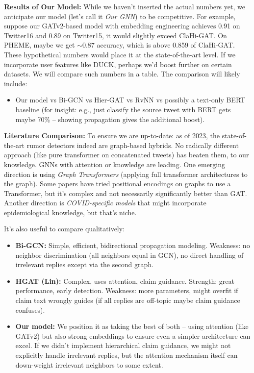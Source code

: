 \documentclass[12pt,a4paper]{report}
\begin{document}
\textbf{Results of Our Model:} While we haven’t inserted the actual numbers yet, we anticipate our model (let’s call it \textit{Our GNN}) to be competitive. For example, suppose our GATv2-based model with embedding engineering achieves 0.91 on Twitter16 and 0.89 on Twitter15, it would slightly exceed ClaHi-GAT. On PHEME, maybe we get \(\sim0.87\) accuracy, which is above 0.859 of ClaHi-GAT. These hypothetical numbers would place it at the state-of-the-art level. If we incorporate user features like DUCK, perhaps we’d boost further on certain datasets. We will compare such numbers in a table. The comparison will likely include:
\begin{itemize}[leftmargin=1.2cm]
    \item Our model vs Bi-GCN vs Hier-GAT vs RvNN vs possibly a text-only BERT baseline (for insight: e.g., just classify the source tweet with BERT gets maybe 70\% – showing propagation gives the additional boost).
\end{itemize}

\textbf{Literature Comparison:} To ensure we are up-to-date: as of 2023, the state-of-the-art rumor detectors indeed are graph-based hybrids. No radically different approach (like pure transformer on concatenated tweets) has beaten them, to our knowledge. GNNs with attention or knowledge are leading. One emerging direction is using \textit{Graph Transformers} (applying full transformer architectures to the graph). Some papers have tried positional encodings on graphs to use a Transformer, but it’s complex and not necessarily significantly better than GAT. Another direction is \textit{COVID-specific models} that might incorporate epidemiological knowledge, but that’s niche.

It’s also useful to compare qualitatively:
\begin{itemize}[leftmargin=1.2cm]
    \item \textbf{Bi-GCN:} Simple, efficient, bidirectional propagation modeling. Weakness: no neighbor discrimination (all neighbors equal in GCN), no direct handling of irrelevant replies except via the second graph.
    \item \textbf{HGAT (Lin):} Complex, uses attention, claim guidance. Strength: great performance, early detection. Weakness: more parameters, might overfit if claim text wrongly guides (if all replies are off-topic maybe claim guidance confuses).
    \item \textbf{Our model:} We position it as taking the best of both – using attention (like GATv2) but also strong embeddings to ensure even a simpler architecture can excel. If we didn’t implement hierarchical claim guidance, we might not explicitly handle irrelevant replies, but the attention mechanism itself can down-weight irrelevant neighbors to some extent.
\end{itemize}
\end{document}
